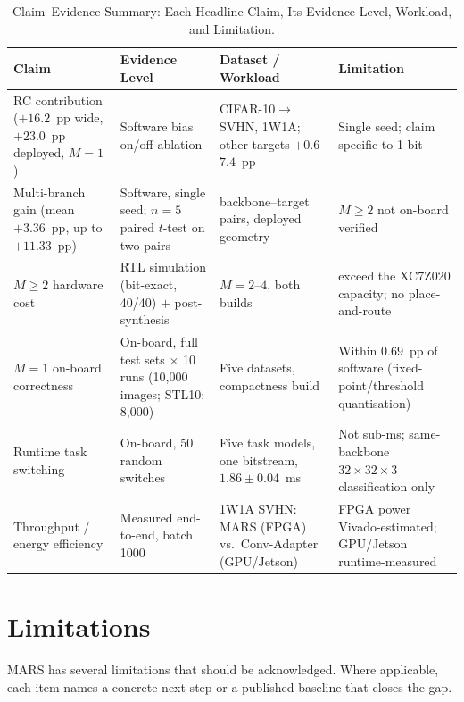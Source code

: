 \documentclass[12pt, a4paper]{report}
\numberwithin{equation}{chapter}
\numberwithin{figure}{chapter}
\numberwithin{table}{chapter}
\numberwithin{algorithm}{chapter}
\begin{document}
\begin{table}[H]
\centering
\caption{Claim--Evidence Summary: Each Headline Claim, Its Evidence Level, Workload, and Limitation.}
\label{tab:evidence_summary}
\footnotesize
\renewcommand{\arraystretch}{1.1}%
\begin{tabular}{>{\raggedright\arraybackslash}p{3.5cm}>{\raggedright\arraybackslash}p{3.3cm}>{\raggedright\arraybackslash}p{3.6cm}>{\raggedright\arraybackslash}p{3.6cm}}
\toprule
\textbf{Claim} & \textbf{Evidence Level} & \textbf{Dataset / Workload} & \textbf{Limitation} \\
\midrule
RC contribution ($+16.2$~pp wide, $+23.0$~pp deployed, $M{=}1$) & Software bias on/off ablation & CIFAR-10$\to$SVHN, 1W1A; other targets $+0.6$--$7.4$~pp & Single seed; claim specific to 1-bit \\
\midrule
Multi-branch gain (mean $+3.36$~pp, up to $+11.33$~pp) & Software, single seed; $n{=}5$ paired $t$-test on two pairs & 20 backbone--target pairs, deployed geometry & $M{\geq}2$ not on-board verified \\
\midrule
$M{\geq}2$ hardware cost & RTL simulation (bit-exact, 40/40) $+$ post-synthesis & $M{=}2$--$4$, both builds & exceed the XC7Z020 capacity; no place-and-route \\
\midrule
$M{=}1$ on-board correctness & On-board, full test sets $\times$ 10 runs (10{,}000 images; STL10: 8{,}000) & Five datasets, compactness build & Within $0.69$~pp of software (fixed-point/threshold quantisation) \\
\midrule
Runtime task switching & On-board, 50 random switches & Five task models, one bitstream, $1.86 \pm 0.04$~ms & Not sub-ms; same-backbone $32{\times}32{\times}3$ classification only \\
\midrule
Throughput / energy efficiency & Measured end-to-end, batch 1000 & 1W1A SVHN: MARS (FPGA) vs.\ Conv-Adapter (GPU/Jetson) & FPGA power Vivado-estimated; GPU/Jetson runtime-measured \\
\bottomrule
\end{tabular}
\end{table}

\section{Limitations}
\label{sec:limitations}

MARS has several limitations that should be acknowledged. Where applicable, each item names a concrete next step or a published baseline that closes the gap.
\end{document}
